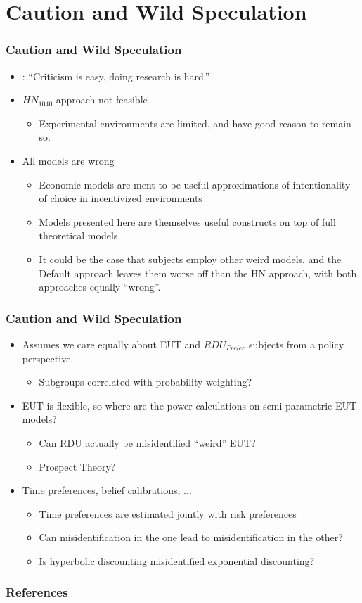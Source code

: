 \documentclass{beamer}
\begin{document}
\section{Caution and Wild Speculation}
\begin{frame}
\frametitle{Caution and Wild Speculation}
\begin{itemize}
	\item \textcite{Gelman2013}: \enquote{Criticism is easy, doing research is hard.}
	\item ${HN}_{1040}$ approach not feasible
		\begin{itemize}
			\item Experimental environments are limited, and have good reason to remain so.
		\end{itemize}
	\item All models are wrong
		\begin{itemize}
			\item Economic models are ment to be useful approximations of intentionality of choice in incentivized environments
			\item Models presented here are themselves useful constructs on top of full theoretical models
			\item It could be the case that subjects employ other weird models, and the Default approach leaves them worse off than the HN approach, with both approaches equally \enquote{wrong}.
		\end{itemize}
\end{itemize}
\end{frame}

\begin{frame}
\frametitle{Caution and Wild Speculation}
\begin{itemize}
	\item Assumes we care equally about EUT and $\mathit{RDU_{Prelec}}$ subjects from a policy perspective.
		\begin{itemize}
			\item Subgroups correlated with probability weighting?
		\end{itemize}
	\item EUT is flexible, so where are the power calculations on semi-parametric EUT models?
		\begin{itemize}
			\item Can RDU actually be misidentified \enquote{weird} EUT?
			\item Prospect Theory?
		\end{itemize}
	\item Time preferences, belief calibrations, ...
		\begin{itemize}
			\item Time preferences are estimated jointly with risk preferences
			\item Can misidentification in the one lead to misidentification in the other?
			\item Is hyperbolic discounting misidentified exponential discounting?
		\end{itemize}
\end{itemize}
\end{frame}

\begin{frame}[allowframebreaks]
\frametitle{References}
\printbibliography[heading=subbibliography]
\end{frame}
\end{document}
